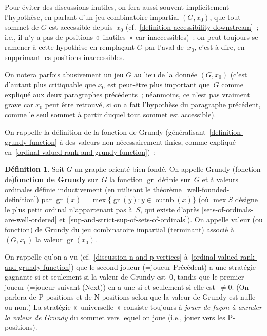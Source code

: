 \documentclass[12pt,a4paper]{article}
\theoremstyle{definition}
\newtheorem{defn}[comcnt]{Définition}
\newcommand{\outnb}{\operatorname{outnb}}
\newcommand{\mex}{\operatorname{mex}}
\newcommand{\gr}{\operatorname{gr}}
\newcommand{\defin}[2][]{\def\latexsucks{#1}\ifx\latexsucks\empty\index{#2}\else\index{\latexsucks}\fi\textbf{#2}}
\begin{document}
Pour éviter des discussions inutiles, on fera aussi souvent
implicitement l'hypothèse, en parlant d'un jeu combinatoire impartial
$(G,x_0)$, que tout sommet de $G$ est accessible depuis $x_0$
(cf. \ref{definition-accessibility-downstream} ; i.e., il n'y a pas de
positions « inutiles » car inaccessibles) : on peut toujours se
ramener à cette hypothèse en remplaçant $G$ par l'aval de $x_0$,
c'est-à-dire, en supprimant les positions inaccessibles.

On notera parfois abusivement un jeu $G$ au lieu de la donnée
$(G,x_0)$ (c'est d'autant plus critiquable que $x_0$ est peut-être
plus important que $G$ comme expliqué aux deux paragraphes
précédents ; néanmoins, ce n'est pas vraiment grave car $x_0$ peut
être retrouvé, si on a fait l'hypothèse du paragraphe précédent, comme
le seul sommet à partir duquel tout sommet est accessible).

\smallbreak

On rappelle la définition de la fonction de Grundy
(généralisant \ref{definition-grundy-function} à des valeurs non
nécessairement finies, comme expliqué
en \ref{ordinal-valued-rank-and-grundy-function}) :

\begin{defn}\label{definition-grundy-function-again}
Soit $G$ un graphe orienté bien-fondé.  On appelle \defin[Grundy
  (fonction de)]{fonction de Grundy} sur $G$ la fonction $\gr$
définie sur $G$ et à valeurs ordinales définie inductivement (en
utilisant le théorème \ref{well-founded-definition}) par $\gr(x) =
\mex\{\gr(y) : y\in\outnb(x)\}$ (où $\mex S$ désigne le plus petit
ordinal n'appartenant pas à $S$, qui existe d'après
\ref{sets-of-ordinals-are-well-ordered}
et \ref{sup-and-strict-sup-of-sets-of-ordinals}).  On appelle valeur
(ou fonction) de Grundy du jeu combinatoire impartial (terminant)
associé à $(G,x_0)$ la valeur $\gr(x_0)$.
\end{defn}

On rappelle qu'on a vu (cf. \ref{discussion-n-and-p-vertices}
à \ref{ordinal-valued-rank-and-grundy-function}) que le second joueur
(=joueur Précédent) a une stratégie gagnante si et seulement si la
valeur de Grundy est $0$, tandis que le premier joueur (=joueur
suivant (Next)) en a une si et seulement si elle est $\neq 0$.  (On
parlera de P-positions et de
N-positions selon que la valeur de Grundy est nulle
ou non.)  La stratégie « universelle » consiste toujours à \emph{jouer
  de façon à annuler la valeur de Grundy} du sommet vers lequel on
joue (i.e., jouer vers les P-positions).
\end{document}
